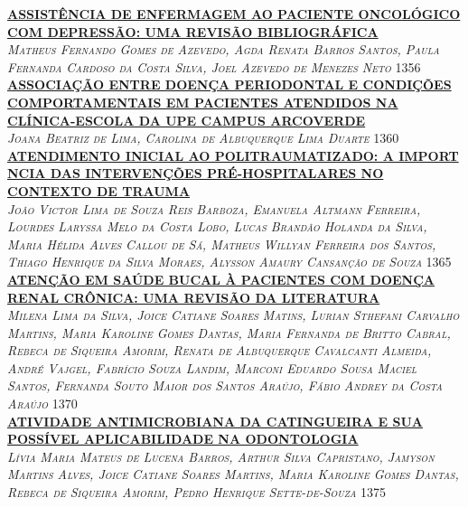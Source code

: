 \noindent \textsc{\hyperlink{trabalhos/250191.pdf.1}{\textbf{ASSISTÊNCIA DE ENFERMAGEM AO PACIENTE ONCOLÓGICO COM DEPRESSÃO: UMA REVISÃO BIBLIOGRÁFICA}}}\\ 
\noindent \textsc{\textit{Matheus Fernando Gomes de Azevedo, Agda Renata Barros Santos, Paula Fernanda Cardoso da Costa Silva, Joel Azevedo de Menezes Neto}} \hfill 1356\\ 

\noindent \textsc{\hyperlink{trabalhos/250174.pdf.1}{\textbf{ASSOCIAÇÃO ENTRE DOENÇA PERIODONTAL E CONDIÇÕES COMPORTAMENTAIS EM PACIENTES ATENDIDOS NA CLÍNICA-ESCOLA DA UPE CAMPUS ARCOVERDE}}}\\ 
\noindent \textsc{\textit{Joana Beatriz de Lima, Carolina de Albuquerque Lima Duarte}} \hfill 1360\\ 

\noindent \textsc{\hyperlink{trabalhos/251590.pdf.1}{\textbf{ATENDIMENTO INICIAL AO POLITRAUMATIZADO: A IMPORT NCIA DAS INTERVENÇÕES PRÉ-HOSPITALARES NO CONTEXTO DE TRAUMA}}}\\ 
\noindent \textsc{\textit{João Victor Lima de Souza Reis Barboza, Emanuela Altmann Ferreira, Lourdes Laryssa Melo da Costa Lobo, Lucas Brandão Holanda da Silva, Maria Hélida Alves Callou de Sá, Matheus Willyan Ferreira dos Santos, Thiago Henrique da Silva Moraes, Alysson Amaury Cansanção de Souza}} \hfill 1365\\ 

\noindent \textsc{\hyperlink{trabalhos/249717.pdf.1}{\textbf{ATENÇÃO EM SAÚDE BUCAL À PACIENTES COM DOENÇA RENAL CRÔNICA: UMA REVISÃO DA LITERATURA}}}\\ 
\noindent \textsc{\textit{Milena Lima da Silva, Joice Catiane Soares Matins, Lurian Sthefani Carvalho Martins, Maria Karoline Gomes Dantas, Maria Fernanda de Britto Cabral, Rebeca de Siqueira Amorim, Renata de Albuquerque Cavalcanti Almeida, André Vajgel, Fabrício Souza Landim, Marconi Eduardo Sousa Maciel Santos, Fernanda Souto Maior dos Santos Araújo, Fábio Andrey da Costa Araújo}} \hfill 1370\\ 

\noindent \textsc{\hyperlink{trabalhos/251126.pdf.1}{\textbf{ATIVIDADE ANTIMICROBIANA DA CATINGUEIRA E SUA POSSÍVEL APLICABILIDADE NA ODONTOLOGIA }}}\\ 
\noindent \textsc{\textit{Lívia Maria Mateus de Lucena Barros, Arthur  Silva Capristano, Jamyson Martins Alves, Joice Catiane Soares Martins, Maria Karoline Gomes Dantas, Rebeca de Siqueira Amorim, Pedro Henrique Sette-de-Souza}} \hfill 1375\\ 

